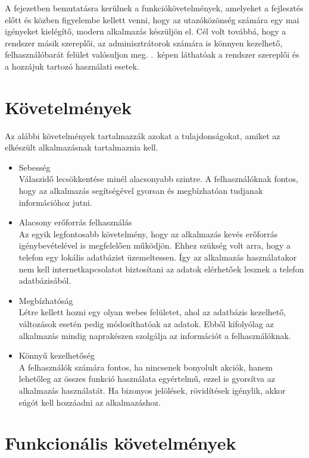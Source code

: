 
A fejezetben bemutatásra kerülnek a funkciókövetelmények, amelyeket a fejlesztés előtt és közben figyelembe kellett venni, hogy az utazóközönség számára egy mai igényeket kielégítő, modern alkalmazás készüljön el.  
Cél volt továbbá, hogy a rendszer másik szereplői, az adminisztrátorok számára is könnyen kezelhető, felhasználóbarát felület valósuljon meg.
.\ képen láthatóak a rendszer szereplői és a hozzájuk tartozó használati esetek. 


\section{Követelmények}
\label{kovetelmeny}

Az alábbi követelmények tartalmazzák azokat a tulajdonságokat, amiket az elkészült alkalmazásnak tartalmaznia kell.

\begin{itemize}
	\item Sebesség
	\\
	Válaszidő lecsökkentése minél alacsonyabb szintre. 
	A felhasználóknak fontos, hogy az alkalmazás segítségével gyorsan és megbízhatóan tudjanak információhoz jutni. 
	\item Alacsony erőforrás felhasználás
	\\
	Az egyik legfontosabb követelmény, hogy az alkalmazás kevés erőforrás igénybevételével is megfelelően működjön. 
	Ehhez szükség volt arra, hogy a telefon egy lokális adatbázist üzemeltessen. 
	Így az alkalmazás használatakor nem kell internetkapcsolatot biztosítani az adatok elérhetőek lesznek a telefon adatbázisából.	
	\item Megbízhatóság
	\\
	Létre kellett hozni egy olyan webes felületet, ahol az adatbázis kezelhető, változások esetén pedig módosíthatóak az adatok. 
	Ebből kifolyólag az alkalmazás mindig naprakészen szolgálja az információt a felhasználóknak.
	\item Könnyű kezelhetőség
	\\
	A felhasználók számára fontos, ha nincsenek bonyolult akciók, hanem lehetőleg az összes funkció használata egyértelmű, ezzel is gyorsítva az alkalmazás használatát. 
	Ha bizonyos jelölések, rövidítések igénylik, akkor súgót kell hozzáadni az alkalmazáshoz.
	
\end{itemize}


\section{Funkcionális követelmények}
\label{funkckov}

